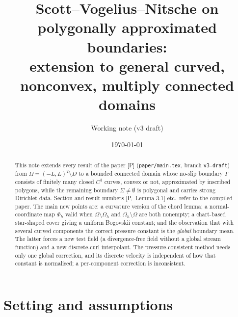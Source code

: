 \documentclass[11pt,reqno]{amsart}
\theoremstyle{plain}
\theoremstyle{definition}
\newcommand{\Oh}{\Omega_h}
\newcommand{\Pref}[1]{\textup{[P,~#1]}}
\begin{document}
\title[SVN on polygonal boundaries: general curved domains]{Scott--Vogelius--Nitsche on polygonally approximated boundaries:\\ extension to general curved, nonconvex, multiply connected domains}
\author{Working note (v3 draft)}
\date{\today}

\begin{abstract}
This note extends every result of the paper [P] (\texttt{paper/main.tex}, branch \texttt{v3-draft}) from $\Omega=(-L,L)^2\setminus\overline D$ to a bounded connected domain whose no-slip boundary $\Gamma$ consists of finitely many closed $C^3$ curves, convex or not, approximated by inscribed polygons, while the remaining boundary $\Sigma\neq\emptyset$ is polygonal and carries strong Dirichlet data. Section and result numbers \Pref{Lemma 3.1} etc.\ refer to the compiled paper. The main new points are: a curvature version of the chord lemma; a normal-coordinate map $\Phi_h$ valid when $\Omega\setminus\Oh$ and $\Oh\setminus\Omega$ are both nonempty; a chart-based star-shaped cover giving a uniform Bogovski\u{\i} constant; and the observation that with several curved components the correct pressure constant is the \emph{global} boundary mean. The latter forces a new test field (a divergence-free field without a global stream function) and a new discrete-curl interpolant. The pressure-consistent method needs only one global correction, and its discrete velocity is independent of how that constant is normalised; a per-component correction is inconsistent.
\end{abstract}

\maketitle

\setcounter{tocdepth}{1}
\tableofcontents

\section{Setting and assumptions}\label{gd:sec:setting}
\end{document}
